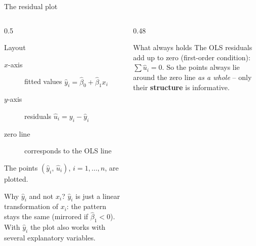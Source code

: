 \documentclass[aspectratio=169,11pt]{beamer}
\begin{document}
\begin{frame}{The residual plot}
  \begin{columns}[T]
    \begin{column}{0.5\textwidth}
      \small
      \begin{block}{Layout}
        \begin{description}
          \item[$x$-axis] fitted values $\hat{y}_i = \hat{\beta}_0 + \hat{\beta}_1 x_i$
          \item[$y$-axis] residuals $\hat{u}_i = y_i - \hat{y}_i$
          \item[zero line] corresponds to the OLS line
        \end{description}
        The points $(\hat{y}_i,\,\hat{u}_i)$, $i = 1,\ldots,n$, are plotted.
      \end{block}
      \begin{block}{Why $\hat{y}_i$ and not $x_i$?}
        $\hat{y}_i$ is just a linear transformation of $x_i$: the pattern stays
        the same (mirrored if $\hat{\beta}_1 < 0$). With $\hat{y}_i$ the plot
        also works with several explanatory variables.
      \end{block}
    \end{column}
    \begin{column}{0.48\textwidth}
      \small
      \begin{exampleblock}{What always holds}
        The OLS residuals add up to zero (first-order condition):
        $\sum \hat{u}_i = 0$. So the points always lie around the zero line
        \emph{as a whole} -- only their \textbf{structure} is informative.
      \end{exampleblock}
    \end{column}
  \end{columns}
\end{frame}
\end{document}

